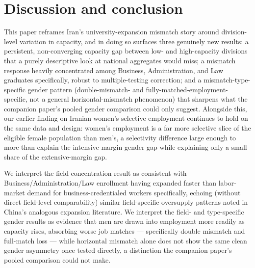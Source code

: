 \documentclass[11pt]{article}
\begin{document}
\section{Discussion and conclusion}

This paper reframes Iran's university-expansion mismatch story around division-level variation in capacity, and in doing so surfaces three genuinely new results: a persistent, non-converging capacity gap between low- and high-capacity divisions that a purely descriptive look at national aggregates would miss; a mismatch response heavily concentrated among Business, Administration, and Law graduates specifically, robust to multiple-testing correction; and a mismatch-type-specific gender pattern (double-mismatch- and fully-matched-employment-specific, not a general horizontal-mismatch phenomenon) that sharpens what the companion paper's pooled gender comparison could only suggest. Alongside this, our earlier finding on Iranian women's selective employment continues to hold on the same data and design: women's employment is a far more selective slice of the eligible female population than men's, a selectivity difference large enough to more than explain the intensive-margin gender gap while explaining only a small share of the extensive-margin gap.

We interpret the field-concentration result as consistent with Business/Administration/Law enrollment having expanded faster than labor-market demand for business-credentialed workers specifically, echoing (without direct field-level comparability) similar field-specific oversupply patterns noted in China's analogous expansion literature. We interpret the field- and type-specific gender results as evidence that men are drawn into employment more readily as capacity rises, absorbing worse job matches --- specifically double mismatch and full-match loss --- while horizontal mismatch alone does not show the same clean gender asymmetry once tested directly, a distinction the companion paper's pooled comparison could not make.
\end{document}
